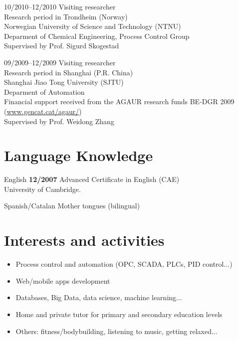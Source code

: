 \documentclass[a4paper]{article}
\begin{document}
\begin{CV}
\item[10/2010--12/2010] Visiting researcher\\
Research period in Trondheim (Norway)\\
Norwegian University of Science and Technology (NTNU)\\
Deparment of Chemical Engineering, Process Control Group\\
Supervised by Prof. Sigurd Skogestad

\item[09/2009--12/2009] Visiting researcher\\
Research period in Shanghai (P.R. China)\\
Shanghai Jiao Tong University (SJTU)\\
Deparment of Automation\\
Financial support received from the AGAUR research funds BE-DGR 2009 (\url{www.gencat.cat/agaur/})\\
Supervised by Prof. Weidong Zhang

\end{CV}

\section{Language Knowledge}
\begin{CV}

\item[English]
\textbf{12/2007} Advanced Certificate in English (CAE) \\ University of
Cambridge.
\item[Spanish/Catalan] Mother tongues
(bilingual)
\end{CV}


\section{Interests and activities}
\begin{itemize}
\item Process control and automation (OPC, SCADA, PLCs, PID control...)
\item Web/mobile apps development
\item Databases, Big Data, data science, machine learning...
\item Home and private tutor for primary and secondary education levels
\item Others: fitness/bodybuilding, listening to music, getting relaxed...
\end{itemize}
\end{document}
